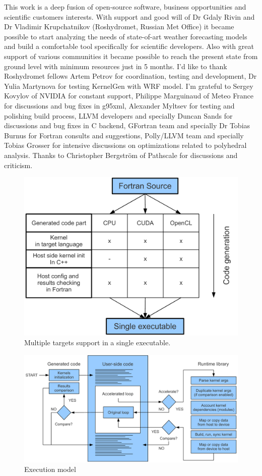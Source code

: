 \documentclass[a4,12pt]{article}
\begin{document}
This work is a deep fusion of open-source software, business opportunities and scientific customers interests. With support and good will of Dr Gdaly Rivin and Dr Vladimir Krupchatnikov (Roshydromet, Russian Met Office) it became possible to start analyzing the needs of state-of-art weather forecasting models and build a comfortable tool specifically for scientific developers. Also with great support of various communities it became possible to reach the present state from ground level with minimum resources just in 5 months. I'd like to thank Roshydromet fellows Artem Petrov for coordination, testing and development, Dr Yulia Martynova for testing KernelGen with WRF model. I'm grateful to Sergey Kovylov of NVIDIA for constant support, Philippe Marguinaud of Meteo France for discussions and bug fixes in g95xml, Alexander Myltsev for testing and polishing build process, LLVM developers and specially Duncan Sands for discussions and bug fixes in C backend, GFortran team and specially Dr Tobias Burnus for Fortran consults and suggestions, Polly/LLVM team and specially Tobias Grosser for intensive discussions on optimizations related to polyhedral analysis. Thanks to Christopher Bergström of Pathscale for discussions and criticism.

\begin{figure}
\centering
\includegraphics[scale=0.5]{figures/portability.pdf}
\caption{Multiple targets support in a single executable.}
\label{fig:portability}
\end{figure}

\begin{figure}
\centering
\includegraphics[scale=0.4]{figures/execution.pdf}
\caption{Execution model}
\label{fig:execution}
\end{figure}
\end{document}
